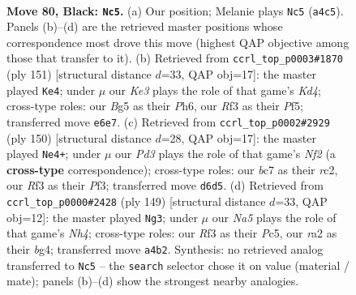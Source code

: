 \documentclass[11pt]{article}
\begin{document}
\clearpage

\begin{figure}[p]\centering
\begin{subfigure}{0.46\textwidth}\centering
\resizebox{\linewidth}{!}{%
\newchessgame
\chessboard[
  setfen={8/2B5/3pk2p/4p1b1/n1K1P2p/5r2/R7/8 b - - 3 80},
  showmover=false,
  pgfstyle=straightmove, color=movearrow, markmove={a4-c5}
]}
\caption{}
\end{subfigure}\hfill
\begin{subfigure}{0.46\textwidth}\centering
\resizebox{\linewidth}{!}{%
\newchessgame
\chessboard[
  setfen={8/6p1/7p/2pk1p1P/R2b1P2/6P1/8/3K4 b - - 2 76},
  showmover=false,
  pgfstyle=straightmove, color=movearrow, markmove={d5-e4}
]}
\caption{}
\end{subfigure}
\\[4pt]
\begin{subfigure}{0.46\textwidth}\centering
\resizebox{\linewidth}{!}{%
\newchessgame
\chessboard[
  setfen={8/1bB4p/1P3k2/8/7P/5PK1/2r2NP1/8 w - - 57 76},
  showmover=false,
  pgfstyle=straightmove, color=movearrow, markmove={f2-e4}
]}
\caption{}
\end{subfigure}\hfill
\begin{subfigure}{0.46\textwidth}\centering
\resizebox{\linewidth}{!}{%
\newchessgame
\chessboard[
  setfen={8/4k3/3p2p1/2p1b2n/2P3B1/1P1K4/8/5R2 b - - 22 75},
  showmover=false,
  pgfstyle=straightmove, color=movearrow, markmove={h5-g3}
]}
\caption{}
\end{subfigure}
\caption{\textbf{Move 80, Black: \texttt{Nc5}.} (a) Our position; Melanie plays \texttt{Nc5} (\texttt{a4c5}). Panels (b)--(d) are the retrieved master positions whose correspondence most drove this move (highest QAP objective among those that transfer to it). (b) Retrieved from \texttt{ccrl\_top\_p0003\#1870} (ply 151) [structural distance $d$=33, QAP obj=17]: the master played \texttt{Ke4}; under $\mu$ our \emph{Ke3} plays the role of that game's \emph{Kd4}; cross-type roles: our \emph{B}g5 as their \emph{P}h6, our \emph{R}f3 as their \emph{P}f5; transferred move \texttt{e6e7}. (c) Retrieved from \texttt{ccrl\_top\_p0002\#2929} (ply 150) [structural distance $d$=28, QAP obj=17]: the master played \texttt{Ne4+}; under $\mu$ our \emph{Pd3} plays the role of that game's \emph{Nf2} (a \textbf{cross-type} correspondence); cross-type roles: our \emph{b}c7 as their \emph{r}c2, our \emph{R}f3 as their \emph{P}f3; transferred move \texttt{d6d5}. (d) Retrieved from \texttt{ccrl\_top\_p0000\#2428} (ply 149) [structural distance $d$=33, QAP obj=12]: the master played \texttt{Ng3}; under $\mu$ our \emph{Na5} plays the role of that game's \emph{Nh4}; cross-type roles: our \emph{R}f3 as their \emph{P}c5, our \emph{r}a2 as their \emph{b}g4; transferred move \texttt{a4b2}. Synthesis: no retrieved analog transferred to \texttt{Nc5} -- the \texttt{search} selector chose it on value (material / mate); panels (b)--(d) show the strongest nearby analogies.}
\label{fig:thought-m159}
\end{figure}
\end{document}
